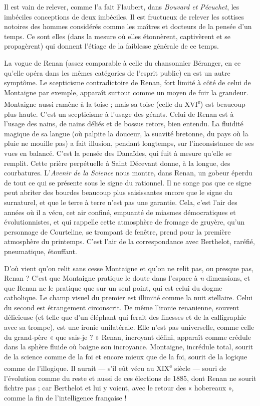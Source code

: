 \documentclass[french,twoside]{book} %
\begin{document}
Il est vain de relever, comme l’a fait Flaubert, dans {\itshape Bouvard et Pécuchet}, les imbéciles conceptions de deux imbéciles. Il est fructueux de relever les sottises notoires des hommes considérés comme les maîtres et docteurs de la pensée d’un temps. Ce sont elles (dans la mesure où elles étonnèrent, captivèrent et se propagèrent) qui donnent l’étiage de la faiblesse générale de ce temps.\par
La vogue de Renan (assez comparable à celle du chansonnier Béranger, en ce qu’elle opéra dans les mêmes catégories de l’esprit public) en est un autre symptôme. Le scepticisme contradictoire de Renan, fort limité à côté de celui de Montaigne par exemple, apparaît surtout comme un moyen de fuir la grandeur. Montaigne aussi ramène à la toise ; mais sa toise (celle du XVI\textsuperscript{e}) est beaucoup plus haute. C’est un scepticisme à l’usage des géants. Celui de Renan est à l’usage des nains, de nains déliés et de bossus retors, bien entendu. La fluidité magique de sa langue (où palpite la douceur, la suavité bretonne, du pays où la pluie ne mouille pas) a fait illusion, pendant longtemps, sur l’inconsistance de ses vues en balancé. C’est la pensée des Danaïdes, qui fuit à mesure qu’elle se remplit. Cette prière perpétuelle à Saint Décevant donne, à la longue, des courbatures. L’{\itshape Avenir de la Science} nous montre, dans Renan, un gobeur éperdu de tout ce qui se présente sous le signe du rationnel. Il ne songe pas que ce signe peut abriter des bourdes beaucoup plus saisissantes encore que le signe du surnaturel, et que le terre à terre n’est pas une garantie. Cela, c’est l’air des années où il a vécu, cet air confiné, empuanté de miasmes démocratiques et évolutionnistes, et qui rappelle cette atmosphère de fromage de gruyère, qu’un personnage de Courteline, se trompant de fenêtre, prend pour la première atmosphère du printemps. C’est l’air de la correspondance avec Berthelot, raréfié, pneumatique, étouffant.\par
D’où vient qu’on relit sans cesse Montaigne et qu’on ne relit pas, ou presque pas, Renan ? C’est que Montaigne pratique le doute dans l’espace à {\itshape n} dimensions, et que Renan ne le pratique que sur un seul point, qui est celui du dogme catholique. Le champ visuel du premier est illimité comme la nuit stellaire. Celui du second est étrangement circonscrit. De même l’ironie renanienne, souvent délicieuse (et telle que d’un éléphant qui ferait des finesses et de la calligraphie avec sa trompe), est une ironie unilatérale. Elle n’est pas universelle, comme celle du grand-père « que sais-je ? » Renan, incroyant défini, apparaît comme crédule dans la sphère fluide où baigne son incroyance. Montaigne, incrédule total, sourit de la science comme de la foi et encore mieux que de la foi, sourit de la logique comme de l’illogique. Il aurait — s’il eût vécu au XIX\textsuperscript{e} siècle — souri de l’évolution comme du reste et aussi de ces élections de 1885, dont Renan ne sourit fichtre pas ; car Berthelot et lui y voient, avec le retour des « hobereaux », comme la fin de l’intelligence française !\par
\end{document}
